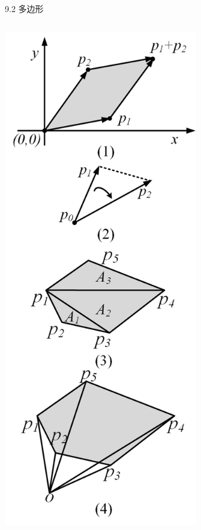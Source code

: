 \begin{frame}{9.2 多边形}
\begin{columns}
        \includegraphics[width=0.8\textwidth]{fig/9-5.png}
    \end{columns}
\end{frame}
